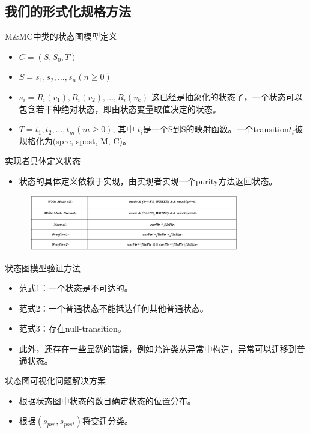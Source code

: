 \documentclass{beamer}
\begin{document}
\subsection{我们的形式化规格方法}
\begin{frame}{M\&MC中类的状态图模型定义}
  \begin{itemize}
  \item $C=(S, S_0, T)$ \pause
  \item $S={s_1, s_2, \ldots, s_n}(n≥0)$ \pause
  \item $s_i={R_i(v_1), R_i (v_2), \ldots, R_i (v_k)}$ 这已经是抽象化的状态了，一个状态可以包含若干种绝对状态，即由状态变量取值决定的状态。 \pause
  \item $T={t_1, t_2, \ldots, t_m}(m≥0)$, 其中 $t_i$是一个S到S的映射函数。一个transition$t_i$被规格化为(spre, spost, M, C)。\pause
  \end{itemize}
\end{frame}
\begin{frame}{实现者具体定义状态}
  \begin{itemize}
  \item 状态的具体定义依赖于实现，由实现者实现一个purity方法返回状态。
  \end{itemize}
  \begin{figure}[H]
  \includegraphics[width=3.6in]{img/1.PNG}
  \end{figure}
\end{frame}
\begin{frame}{状态图模型验证方法}
  \begin{itemize}
  \item 范式1：一个状态是不可达的。\pause
  \item 范式2：一个普通状态不能抵达任何其他普通状态。\pause
  \item 范式3：存在null-transition。\pause
  \item 此外，还存在一些显然的错误，例如允许类从异常中构造，异常可以迁移到普通状态。\pause
  \end{itemize}
\end{frame}
\begin{frame}{状态图可视化问题解决方案}
  \begin{itemize}
  \item 根据状态图中状态的数目确定状态的位置分布。\pause
  \item 根据$(s_{pre},s_{post})$将变迁分类。\pause
  \end{itemize}
\end{frame}
\end{document}
